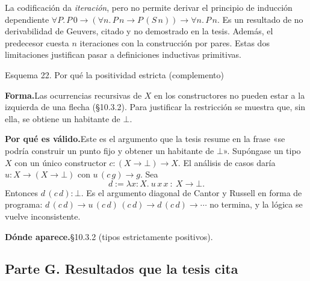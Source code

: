 \documentclass[11pt,a4paper]{article}
\newcommand{\forma}{\par\noindent\textbf{Forma.}\enspace}
\newcommand{\porque}{\par\smallskip\noindent\textbf{Por qué es válido.}\enspace}
\newcommand{\donde}{\par\smallskip\noindent\textbf{Dónde aparece.}\enspace}
\begin{document}
\begin{trampa}
La codificación da \emph{iteración}, pero no permite derivar el principio de
inducción dependiente \(\forall P.\,P\,0\to(\forall n.\,P\,n\to P\,(S\,n))\to\forall n.\,P\,n\).
Es un resultado de no derivabilidad de Geuvers, citado y no demostrado en la
tesis. Además, el predecesor cuesta \(n\) iteraciones con la construcción por
pares. Estas dos limitaciones justifican pasar a definiciones inductivas
primitivas.
\end{trampa}

\begin{esquema}{Esquema 22. Por qué la positividad estricta (complemento)}
\forma Las ocurrencias recursivas de \(X\) en los constructores no pueden estar
a la izquierda de una flecha (§10.3.2). Para justificar la restricción se
muestra que, sin ella, se obtiene un habitante de \(\bot\).

\porque Este es el argumento que la tesis resume en la frase «se podría
construir un punto fijo y obtener un habitante de \(\bot\)». Supóngase un tipo
\(X\) con un único constructor \(c:(X\to\bot)\to X\). El análisis de casos
daría \(u:X\to(X\to\bot)\) con \(u\,(c\,g)\to g\). Sea
\[
d:=\lambda x{:}X.\ u\,x\,x\ :\ X\to\bot.
\]
Entonces \(d\,(c\,d):\bot\). Es el argumento diagonal de Cantor y Russell en
forma de programa: \(d\,(c\,d)\to u\,(c\,d)\,(c\,d)\to d\,(c\,d)\to\cdots\)
no termina, y la lógica se vuelve inconsistente.

\donde §10.3.2 (tipos estrictamente positivos).
\end{esquema}

\subsection*{Parte G. Resultados que la tesis cita}
\end{document}
